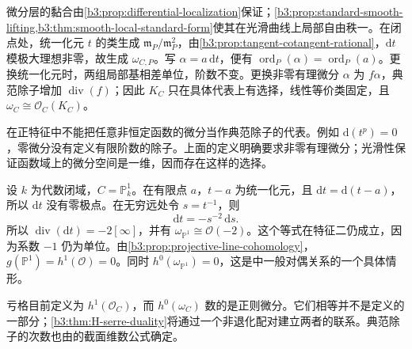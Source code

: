 微分层的黏合由\cref{b3:prop:differential-localization}保证；\cref{b3:prop:standard-smooth-lifting,b3:thm:smooth-local-standard-form}使其在光滑曲线上局部自由秩一。在闭点处，统一化元 \(t\) 的类生成 \(\mathfrak m_P/\mathfrak m_P^2\)，由\cref{b3:prop:tangent-cotangent-rational}，\(\mathrm{d}t\) 模极大理想非零，故生成 \(\omega_{C,P}\)。写 \(\alpha=a\,\mathrm{d}t\)，便有 \(\operatorname{ord}_P(\alpha)=\operatorname{ord}_P(a)\)。更换统一化元时，两组局部基相差单位，阶数不变。更换非零有理微分 \(\alpha\) 为 \(f\alpha\)，典范除子增加 \(\operatorname{div}(f)\)；因此 \(K_C\) 只在具体代表上有选择，线性等价类固定，且 \(\omega_C\cong\mathcal O_C(K_C)\)。

\ProseParagraphBreak
在正特征中不能把任意非恒定函数的微分当作典范除子的代表。例如 \(\mathrm{d}(t^p)=0\)，零微分没有定义有限阶数的除子。上面的定义明确要求非零有理微分；光滑性保证函数域上的微分空间是一维，因而存在这样的选择。

\begin{example}\label{b3:exm:H-projective-line-canonical}
	设 \(k\) 为代数闭域，\(C=\mathbb P_k^1\)。在有限点 \(a\)，\(t-a\) 为统一化元，且 \(\mathrm{d}t=\mathrm{d}(t-a)\)，所以 \(\mathrm{d}t\) 没有零极点。在无穷远处令 \(s=t^{-1}\)，则
	\[
		\mathrm{d}t=-s^{-2}\,\mathrm{d}s.
	\]
	所以 \(\operatorname{div}(\mathrm{d}t)=-2[\infty]\)，并有 \(\omega_{\mathbb P^1}\cong\mathcal O(-2)\)。这个等式在特征二仍成立，因为系数 \(-1\) 仍为单位。由\cref{b3:prop:projective-line-cohomology}，\(g(\mathbb P^1)=h^1(\mathcal O)=0\)。同时 \(h^0(\omega_{\mathbb P^1})=0\)，这是中一般对偶关系的一个具体情形。
\end{example}

亏格目前定义为 \(h^1(\mathcal O_C)\)，而 \(h^0(\omega_C)\) 数的是正则微分。它们相等并不是定义的一部分；\cref{b3:thm:H-serre-duality}将通过一个非退化配对建立两者的联系。典范除子的次数也由的截面维数公式确定。

